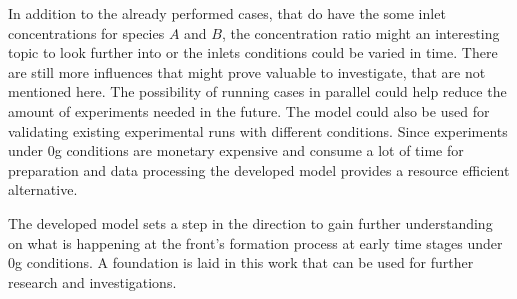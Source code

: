 \documentclass[../thesis.tex]{subfiles}
\begin{document}
In addition to the already performed cases, that do have the some inlet concentrations for species $A$ and $B$, the concentration ratio might an interesting topic to look further into or the inlets conditions could be varied in time. There are still more influences that might prove valuable to investigate, that are not mentioned here. 
The possibility of running cases in parallel could help reduce the amount of experiments needed in the future. The model could also be used for validating existing experimental runs with different conditions. Since experiments under 0g conditions are monetary expensive and consume a lot of time for preparation and data processing the developed model provides a resource efficient alternative.

The developed model sets a step in the direction to gain further understanding on what is happening at the front's formation process at early time stages under 0g conditions. A foundation is laid in this work that can be used for further research and investigations.
\end{document}
